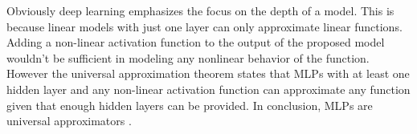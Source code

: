 \newpage
Obviously deep learning emphasizes the focus on the depth of a model. This is because linear models with just one layer can only approximate linear functions. Adding a non-linear activation function to the output of the proposed model wouldn't be sufficient in modeling any nonlinear behavior of the function. However the universal approximation theorem \cite{Hornik1989} states that MLPs with at least one hidden layer and any non-linear activation function can approximate any function given that enough hidden layers can be provided. In conclusion, MLPs are universal approximators \cite{Goodfellow}.\\
